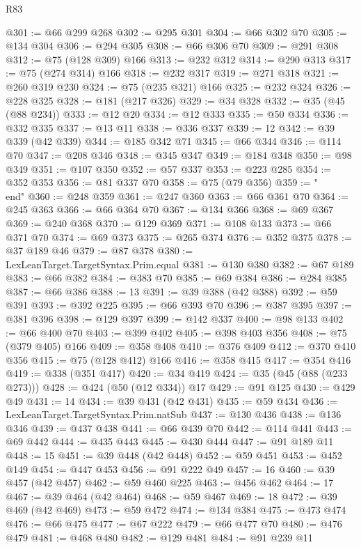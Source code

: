 \begin{lexlean}{R83}
\begin{coremodule}
@301 := @66 @299 @268
@302 := @295 @301
@304 := @66 @302 @70
@305 := @134 @304
@306 := @294 @305
@308 := @66 @306 @70
@309 := @291 @308
@312 := @75 (@128 @309) @166
@313 := @232 @312
@314 := @290 @313
@317 := @75 (@274 @314) @166
@318 := @232 @317
@319 := @271 @318
@321 := @260 @319 @230
@324 := @75 (@235 @321) @166
@325 := @232 @324
@326 := @228 @325
@328 := @181 (@217 @326)
@329 := @34 @328
@332 := @35 (@45 (@88 @234))
@333 := @12 @20
@334 := @12 @333
@335 := @50 @334
@336 := @332 @335
@337 := @13 @11
@338 := @336 @337
@339 := 12
@342 := @39 @339 (@42 @339)
@344 := @185 @342 @71
@345 := @66 @344
@346 := @114 @70
@347 := @208 @346
@348 := @345 @347
@349 := @184 @348
@350 := @98 @349
@351 := @107 @350
@352 := @57 @337
@353 := @223 @285
@354 := @352 @353
@356 := @81 @337 @70
@358 := @75 (@79 @356)
@359 := "\\end"
@360 := @248 @359
@361 := @247 @360
@363 := @66 @361 @70
@364 := @245 @363
@366 := @66 @364 @70
@367 := @134 @366
@368 := @69 @367
@369 := @240 @368
@370 := @129 @369
@371 := @108 @133
@373 := @66 @371 @70
@374 := @69 @373
@375 := @265 @374
@376 := @352 @375
@378 := @37 @189 @46
@379 := @87 @378
@380 := LexLeanTarget.TargetSyntax.Prim.equal
@381 := @130 @380
@382 := @67 @189
@383 := @66 @382
@384 := @383 @70
@385 := @69 @384
@386 := @284 @385
@387 := @66 @386
@388 := 13
@391 := @39 @388 (@42 @388)
@392 := @59 @391
@393 := @392 @225
@395 := @66 @393 @70
@396 := @387 @395
@397 := @381 @396
@398 := @129 @397
@399 := @142 @337
@400 := @98 @133
@402 := @66 @400 @70
@403 := @399 @402
@405 := @398 @403 @356
@408 := @75 (@379 @405) @166
@409 := @358 @408
@410 := @376 @409
@412 := @370 @410 @356
@415 := @75 (@128 @412) @166
@416 := @358 @415
@417 := @354 @416
@419 := @338 (@351 @417)
@420 := @34 @419
@424 := @35 (@45 (@88 (@233 @273)))
@428 := @424 (@50 (@12 @334)) @17
@429 := @91 @125
@430 := @429 @49
@431 := 14
@434 := @39 @431 (@42 @431)
@435 := @59 @434
@436 := LexLeanTarget.TargetSyntax.Prim.natSub
@437 := @130 @436
@438 := @136 @346
@439 := @437 @438
@441 := @66 @439 @70
@442 := @114 @441
@443 := @69 @442
@444 := @435 @443
@445 := @430 @444
@447 := @91 @189 @11
@448 := 15
@451 := @39 @448 (@42 @448)
@452 := @59 @451
@453 := @452 @149
@454 := @447 @453
@456 := @91 @222 @49
@457 := 16
@460 := @39 @457 (@42 @457)
@462 := @59 @460 @225
@463 := @456 @462
@464 := 17
@467 := @39 @464 (@42 @464)
@468 := @59 @467
@469 := 18
@472 := @39 @469 (@42 @469)
@473 := @59 @472
@474 := @134 @384
@475 := @473 @474
@476 := @66 @475
@477 := @67 @222
@479 := @66 @477 @70
@480 := @476 @479
@481 := @468 @480
@482 := @129 @481
@484 := @91 @239 @11

\end{coremodule}
\end{lexlean}
